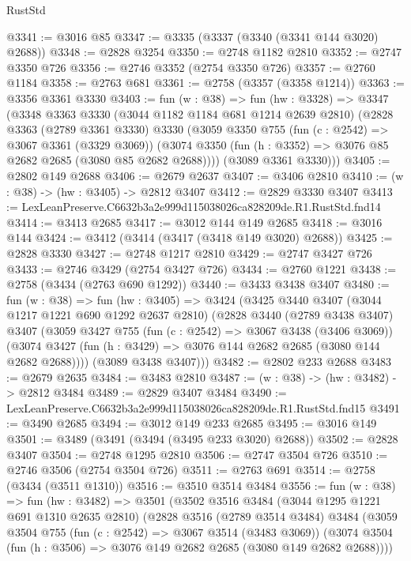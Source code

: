 \begin{lexlean}{RustStd}
\begin{coremodule}
@3341 := @3016 @85
@3347 := @3335 (@3337 (@3340 (@3341 @144 @3020) @2688))
@3348 := @2828 @3254
@3350 := @2748 @1182 @2810
@3352 := @2747 @3350 @726
@3356 := @2746 @3352 (@2754 @3350 @726)
@3357 := @2760 @1184
@3358 := @2763 @681
@3361 := @2758 (@3357 (@3358 @1214))
@3363 := @3356 @3361 @3330
@3403 := fun (w : @38) =>
  fun (hw : @3328) =>
  @3347
    (@3348
      @3363
      @3330
      (@3044 @1182 @1184 @681 @1214 @2639 @2810)
      (@2828
        @3363
        (@2789 @3361 @3330)
        @3330
        (@3059
          @3350
          @755
          (fun (c : @2542) => @3067 @3361 (@3329 @3069))
          (@3074 @3350 (fun (h : @3352) => @3076 @85 @2682 @2685 (@3080 @85 @2682 @2688))))
        (@3089 @3361 @3330)))
@3405 := @2802 @149 @2688
@3406 := @2679 @2637
@3407 := @3406 @2810
@3410 := (w : @38) -> (hw : @3405) -> @2812 @3407
@3412 := @2829 @3330 @3407
@3413 := LexLeanPreserve.C6632b3a2e999d115038026ca828209de.R1.RustStd.fnd14
@3414 := @3413 @2685
@3417 := @3012 @144 @149 @2685
@3418 := @3016 @144
@3424 := @3412 (@3414 (@3417 (@3418 @149 @3020) @2688))
@3425 := @2828 @3330
@3427 := @2748 @1217 @2810
@3429 := @2747 @3427 @726
@3433 := @2746 @3429 (@2754 @3427 @726)
@3434 := @2760 @1221
@3438 := @2758 (@3434 (@2763 @690 @1292))
@3440 := @3433 @3438 @3407
@3480 := fun (w : @38) =>
  fun (hw : @3405) =>
  @3424
    (@3425
      @3440
      @3407
      (@3044 @1217 @1221 @690 @1292 @2637 @2810)
      (@2828
        @3440
        (@2789 @3438 @3407)
        @3407
        (@3059
          @3427
          @755
          (fun (c : @2542) => @3067 @3438 (@3406 @3069))
          (@3074 @3427 (fun (h : @3429) => @3076 @144 @2682 @2685 (@3080 @144 @2682 @2688))))
        (@3089 @3438 @3407)))
@3482 := @2802 @233 @2688
@3483 := @2679 @2635
@3484 := @3483 @2810
@3487 := (w : @38) -> (hw : @3482) -> @2812 @3484
@3489 := @2829 @3407 @3484
@3490 := LexLeanPreserve.C6632b3a2e999d115038026ca828209de.R1.RustStd.fnd15
@3491 := @3490 @2685
@3494 := @3012 @149 @233 @2685
@3495 := @3016 @149
@3501 := @3489 (@3491 (@3494 (@3495 @233 @3020) @2688))
@3502 := @2828 @3407
@3504 := @2748 @1295 @2810
@3506 := @2747 @3504 @726
@3510 := @2746 @3506 (@2754 @3504 @726)
@3511 := @2763 @691
@3514 := @2758 (@3434 (@3511 @1310))
@3516 := @3510 @3514 @3484
@3556 := fun (w : @38) =>
  fun (hw : @3482) =>
  @3501
    (@3502
      @3516
      @3484
      (@3044 @1295 @1221 @691 @1310 @2635 @2810)
      (@2828
        @3516
        (@2789 @3514 @3484)
        @3484
        (@3059
          @3504
          @755
          (fun (c : @2542) => @3067 @3514 (@3483 @3069))
          (@3074 @3504 (fun (h : @3506) => @3076 @149 @2682 @2685 (@3080 @149 @2682 @2688))))

\end{coremodule}
\end{lexlean}
